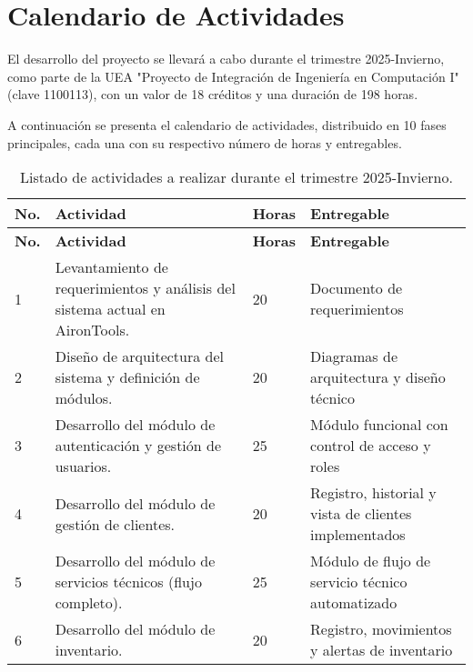 \section{Calendario de Actividades}

El desarrollo del proyecto se llevará a cabo durante el trimestre 2025-Invierno, como parte de la UEA "Proyecto de Integración de Ingeniería en Computación I" (clave 1100113), con un valor de 18 créditos y una duración de 198 horas.

A continuación se presenta el calendario de actividades, distribuido en 10 fases principales, cada una con su respectivo número de horas y entregables.

\begin{longtable}{p{} p{} p{} p{}}
  \label{table:calendarioActividades}\\
  \toprule
\textbf{No.} & \textbf{Actividad} & \textbf{Horas} & \textbf{Entregable} \\
\hline
\endfirsthead

\hline
\textbf{No.} & \textbf{Actividad} & \textbf{Horas} & \textbf{Entregable} \\
\hline
\endhead

\hline
\caption{Listado de actividades a realizar durante el trimestre 2025-Invierno.}
\endlastfoot

1 & Levantamiento de requerimientos y análisis del sistema actual en AironTools. & 20 & Documento de requerimientos \\
\midrule

2 & Diseño de arquitectura del sistema y definición de módulos. & 20 & Diagramas de arquitectura y diseño técnico \\
\midrule

3 & Desarrollo del módulo de autenticación y gestión de usuarios. & 25 & Módulo funcional con control de acceso y roles \\
\midrule

4 & Desarrollo del módulo de gestión de clientes. & 20 & Registro, historial y vista de clientes implementados \\
\midrule

5 & Desarrollo del módulo de servicios técnicos (flujo completo). & 25 & Módulo de flujo de servicio técnico automatizado \\
\midrule

6 & Desarrollo del módulo de inventario. & 20 & Registro, movimientos y alertas de inventario \\
\midrule


\end{longtable}

